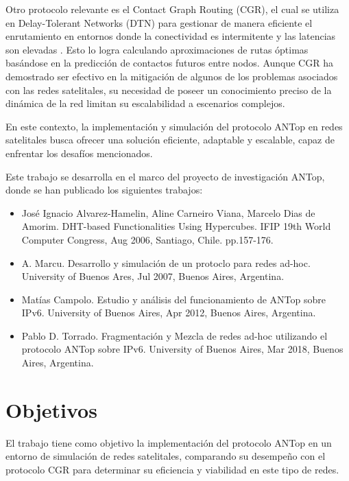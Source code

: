 Otro protocolo relevante es el Contact Graph Routing (CGR), el cual se utiliza en Delay-Tolerant Networks (DTN) para gestionar de manera eficiente el enrutamiento en entornos donde la conectividad es intermitente y las latencias son elevadas \cite{burleigh-dtnrg-cgr-01}. Esto lo logra calculando aproximaciones de rutas óptimas basándose en la predicción de contactos futuros entre nodos. Aunque CGR ha demostrado ser efectivo en la mitigación de algunos de los problemas asociados con las redes satelitales, su necesidad de poseer un conocimiento preciso de la dinámica de la red limitan su escalabilidad a escenarios complejos.

En este contexto, la implementación y simulación del protocolo ANTop en redes satelitales busca ofrecer una solución eficiente, adaptable y escalable, capaz de enfrentar los desafíos mencionados.

Este trabajo se desarrolla en el marco del proyecto de investigación ANTop, donde se han publicado los siguientes trabajos:
\begin{itemize}
    \item José Ignacio Alvarez-Hamelin, Aline Carneiro Viana, Marcelo Dias de Amorim. DHT-based Functionalities Using Hypercubes. IFIP 19th World Computer Congress, Aug 2006, Santiago, Chile. pp.157-176.
    \item A. Marcu. Desarrollo y simulación de un protoclo para redes ad-hoc. University of Buenos Ares, Jul 2007, Buenos Aires, Argentina.
    \item Matías Campolo. Estudio y análisis del funcionamiento de ANTop sobre IPv6. University of Buenos Aires, Apr 2012, Buenos Aires, Argentina.
    \item Pablo D. Torrado. Fragmentación y Mezcla de redes ad-hoc utilizando el protocolo ANTop sobre IPv6. University of Buenos Aires, Mar 2018, Buenos Aires, Argentina.
\end{itemize}

\section{Objetivos}
El trabajo tiene como objetivo la implementación del protocolo ANTop en un entorno de simulación de redes satelitales, comparando su desempeño con el protocolo CGR para determinar su eficiencia y viabilidad en este tipo de redes.

